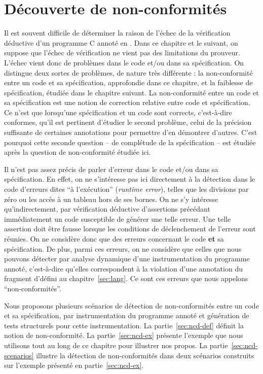 
\chapter{Découverte de non-conformités}
\label{sec:ncd}

\chapterintro


Il est souvent difficile de déterminer la raison de l'échec de la vérification
déductive d'un programme C annoté en \eacsl.
Dans ce chapitre et le suivant, on suppose que l'échec de vérification ne vient
pas des limitations du prouveur.
L'échec vient donc de problèmes dans le code et/ou dans sa spécification.
On distingue deux sortes de problèmes, de nature très différente : la
non-conformité entre un code et sa spécification, approfondie dans ce chapitre,
et la faiblesse de spécification, étudiée dans le chapitre suivant.
La non-conformité entre un code et sa spécification est une notion de correction
relative entre code et spécification.
Ce n'est que lorsqu'une spécification et un code sont corrects, c'est-à-dire
conformes, qu'il est pertinent d'étudier le second problème, celui de la
précision suffisante de certaines annotations pour permettre d'en démontrer
d'autres.
C'est pourquoi cette seconde question -- de complétude de la spécification --
est étudiée après la question de non-conformité étudiée ici.

Il n'est pas assez précis de parler d'erreur dans le code et/ou dans sa
spécification.
En effet, on ne s'intéresse pas ici directement à la détection dans le code
d'erreurs dites ``à l'exécution'' (\textit{runtime error}), telles que les
divisions par zéro ou les accès à un tableau hors de ses bornes.
On ne s'y intéresse qu'indirectement, par vérification déductive d'assertions
précédant immédiatement un code susceptible de générer une telle erreur.
Une telle assertion doit être fausse lorsque les conditions de déclenchement de
l'erreur sont réunies.
On ne considère donc que des erreurs concernant le code \textbf{et} sa
spécification.
De plus, parmi ces erreurs, on ne considère que celles que nous pouvons
détecter par analyse dynamique d'une instrumentation du programme annoté,
c'est-à-dire qu'elles correspondent à la violation d'une annotation du fragment
d'\eacsl défini au chapitre~\ref{sec:lang}.
Ce sont ces erreurs que nous appelons ``non-conformités''.

Nous proposons plusieurs scénarios de détection de non-conformités entre un code
et sa spécification, par instrumentation du programme annoté et génération de
tests structurels pour cette instrumentation.
La partie~\ref{sec:ncd-def} définit la notion de non-conformité.
La partie~\ref{sec:ncd-ex} présente l'exemple que nous utilisons tout au long
de ce chapitre pour illustrer nos propos.
La partie~\ref{sec:ncd-scenarios} illustre la détection de non-conformités dans
deux scénarios construits sur l'exemple présenté en partie~\ref{sec:ncd-ex}.


